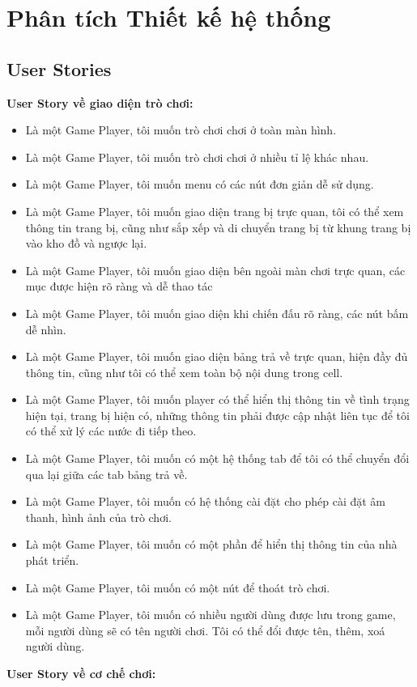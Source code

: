 \section{Phân tích Thiết kế hệ thống}

\subsection{User Stories}
\textbf{User Story về giao diện trò chơi:}
\begin{itemize}
	\item Là một Game Player, tôi muốn trò chơi chơi ở toàn màn hình.
	\item Là một Game Player, tôi muốn trò chơi chơi ở nhiều tỉ lệ khác nhau.
	\item Là một Game Player, tôi muốn menu có các nút đơn giản dễ sử dụng.
	\item Là một Game Player, tôi muốn giao diện trang bị trực quan, tôi có thể xem thông tin trang bị, cũng như sắp xếp và di chuyển trang bị từ khung trang bị vào kho đồ và ngược lại.
	\item Là một Game Player, tôi muốn giao diện bên ngoài màn chơi trực quan, các mục được hiện rõ ràng và dễ thao tác
	\item Là một Game Player, tôi muốn giao diện khi chiến đấu rõ ràng, các nút bấm dễ nhìn.
	\item Là một Game Player, tôi muốn giao diện bảng trả về trực quan, hiện đầy đủ thông tin, cũng như tôi có thể xem toàn bộ nội dung trong cell.
	\item Là một Game Player, tôi muốn player có thể hiển thị thông tin về tình trạng hiện tại, trang bị hiện có, những thông tin phải được cập nhật liên tục để tôi có thể xử lý các nước đi tiếp theo.
	\item Là một Game Player, tôi muốn có một hệ thống tab để tôi có thể chuyển đổi qua lại giữa các tab bảng trả về. 
	\item Là một Game Player, tôi muốn có hệ thống cài đặt cho phép cài đặt âm thanh, hình ảnh của trò chơi.
	\item Là một Game Player, tôi muốn có một phần để hiển thị thông tin của nhà phát triển.
	\item Là một Game Player, tôi muốn có một nút để thoát trò chơi.
	\item Là một Game Player, tôi muốn có nhiều người dùng được lưu trong game, mỗi người dùng sẽ có tên người chơi. Tôi có thể đổi được tên, thêm, xoá người dùng.
\end{itemize}
\textbf{User Story về cơ chế chơi:}

